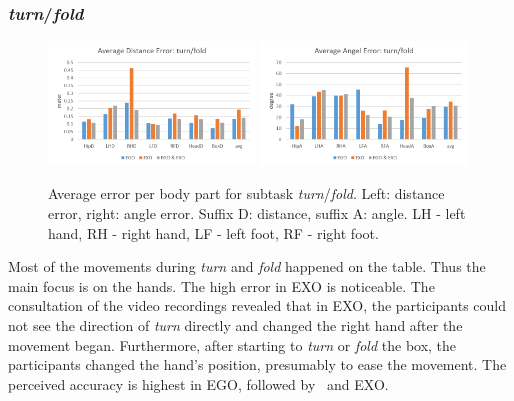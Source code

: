 \subsubsection{\textit{turn}/\textit{fold}}
\begin{figure}[H]
	\centering
	\includegraphics[width=0.49\textwidth]{figures/distanceErrorTurnFold.png}
	\includegraphics[width=0.49\textwidth]{figures/angleErrorTurnFold.png}
	\caption[Average error per body part for subtask \textit{turn}/\textit{fold}.]{Average error per body part for subtask \textit{turn}/\textit{fold}. Left: distance error, right: angle error. Suffix D: distance, suffix A: angle. LH - left hand, RH - right hand, LF - left foot, RF - right foot.}
	\label{fig:errorTurnFold}
\end{figure}
Most of the movements during \textit{turn} and \textit{fold} happened on the table. Thus the main focus is on the hands. The high error in EXO is noticeable. The consultation of the video recordings revealed that in EXO, the participants could not see the direction of \textit{turn} directly and changed the right hand after the movement began. Furthermore, after starting to \textit{turn} or \textit{fold} the box, the participants changed the hand's position, presumably to ease the movement. The perceived accuracy is highest in EGO, followed by \combi\ and EXO. 


